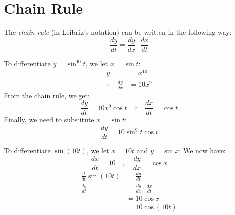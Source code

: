 \documentclass[../main.tex]{subfiles}
\begin{document}
\section{Chain Rule}
The \emph{chain rule} (in Leibniz's notation) can be written 
in the following way:
\[ \frac{dy}{dt} = \frac{dy}{dx} \cdot \frac{dx}{dt} \]
\begin{exmp}
    To differentiate $y = \sin^{10} t$, we let 
    $x = \sin t$:
    \begin{align*}
        y &= x^{10}\\
        \therefore \quad \frac{dy}{dx} &= 10x^9
    \end{align*}
    From the chain rule, we get:
    \[ \frac{dy}{dt} = 10x^9 \cos t \quad \because \quad \frac{dx}{dt} = \cos t \]
    Finally, we need to substitute $x = \sin t$:
    \[ \frac{dy}{dt} = 10 \sin^9 t \cos t \]
\end{exmp}
\begin{exmp}
    To differentiate $\sin (10t)$, we let 
    $x = 10t$ and $y = \sin x$:
    We now have:
    \[ \frac{dx}{dt} = 10 \quad , \quad \frac{dy}{dx} = \cos x \]
    \begin{align*}
        \frac{d}{dt} \sin (10t) &= \frac{dy}{dt}\\
        \frac{dy}{dt}           &= \frac{dy}{dx} \cdot \frac{dx}{dt}\\
                                &= 10 \cos x\\
                                &= 10 \cos (10t)
    \end{align*}
\end{exmp}
\end{document}
